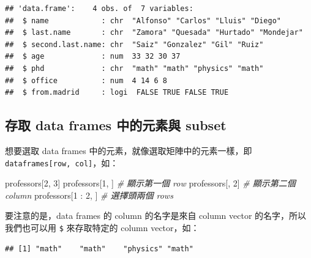 \documentclass[
]{book}
\newenvironment{Shaded}{\begin{snugshade}}{\end{snugshade}}
\newcommand{\CommentTok}[1]{\textcolor[rgb]{0.56,0.35,0.01}{\textit{#1}}}
\newcommand{\DecValTok}[1]{\textcolor[rgb]{0.00,0.00,0.81}{#1}}
\newcommand{\NormalTok}[1]{#1}
\newcommand{\SpecialCharTok}[1]{\textcolor[rgb]{0.00,0.00,0.00}{#1}}
\theoremstyle{definition}
\theoremstyle{remark}
\begin{document}
\begin{verbatim}
## 'data.frame':    4 obs. of  7 variables:
##  $ name            : chr  "Alfonso" "Carlos" "Lluis" "Diego"
##  $ last.name       : chr  "Zamora" "Quesada" "Hurtado" "Mondejar"
##  $ second.last.name: chr  "Saiz" "Gonzalez" "Gil" "Ruiz"
##  $ age             : num  33 32 30 37
##  $ phd             : chr  "math" "math" "physics" "math"
##  $ office          : num  4 14 6 8
##  $ from.madrid     : logi  FALSE TRUE FALSE TRUE
\end{verbatim}

\hypertarget{dataframesubsetting}{%
\subsection{存取 data frames 中的元素與 subset}\label{dataframesubsetting}}

想要選取 data frames 中的元素，就像選取矩陣中的元素一樣，即 \texttt{dataframes{[}row,\ col{]}}，如：

\begin{Shaded}
\begin{Highlighting}[]
\NormalTok{professors[}\DecValTok{2}\NormalTok{, }\DecValTok{3}\NormalTok{]}
\NormalTok{professors[}\DecValTok{1}\NormalTok{, ]  }\CommentTok{\# 顯示第一個 row}
\NormalTok{professors[, }\DecValTok{2}\NormalTok{]  }\CommentTok{\# 顯示第二個 column}
\NormalTok{professors[}\DecValTok{1} \SpecialCharTok{:} \DecValTok{2}\NormalTok{, ]  }\CommentTok{\# 選擇頭兩個 rows}
\end{Highlighting}
\end{Shaded}

要注意的是，data frames 的 column 的名字是來自 column vector 的名字，所以我們也可以用 \texttt{\$} 來存取特定的 column vector，如：

\begin{Shaded}
\end{Shaded}

\begin{verbatim}
## [1] "math"    "math"    "physics" "math"
\end{verbatim}

\begin{Shaded}
\end{Shaded}
\end{document}
